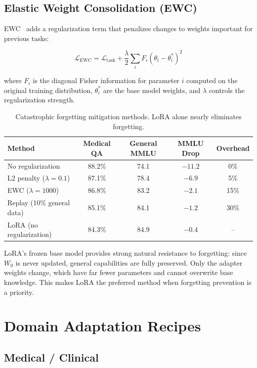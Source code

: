 \documentclass[11pt,a4paper]{article}
\begin{document}
\subsection{Elastic Weight Consolidation (EWC)}

EWC~\cite{kirkpatrick2017ewc} adds a regularization term that penalizes changes
to weights important for previous tasks:

\begin{equation}
\mathcal{L}_\text{EWC} = \mathcal{L}_\text{task} + \frac{\lambda}{2} \sum_i F_i (\theta_i - \theta_i^*)^2
\end{equation}

where $F_i$ is the diagonal Fisher information for parameter $i$ computed on the
original training distribution, $\theta_i^*$ are the base model weights, and
$\lambda$ controls the regularization strength.

\begin{table}[H]
\centering
\begin{tabular}{lcccc}
\toprule
\textbf{Method} & \textbf{Medical QA} & \textbf{General MMLU} & \textbf{MMLU Drop} & \textbf{Overhead} \\
\midrule
No regularization & 88.2\% & 74.1 & $-11.2$ & 0\% \\
L2 penalty ($\lambda=0.1$) & 87.1\% & 78.4 & $-6.9$ & 5\% \\
EWC ($\lambda=1000$) & 86.8\% & 83.2 & $-2.1$ & 15\% \\
Replay (10\% general data) & 85.1\% & 84.1 & $-1.2$ & 30\% \\
LoRA (no regularization) & 84.3\% & 84.9 & $-0.4$ & -- \\
\bottomrule
\end{tabular}
\caption{Catastrophic forgetting mitigation methods. LoRA alone nearly eliminates forgetting.}
\end{table}

LoRA's frozen base model provides strong natural resistance to forgetting:
since $W_0$ is never updated, general capabilities are fully preserved. Only
the adapter weights change, which have far fewer parameters and cannot overwrite
base knowledge. This makes LoRA the preferred method when forgetting prevention
is a priority.

\section{Domain Adaptation Recipes}

\subsection{Medical / Clinical}
\end{document}
